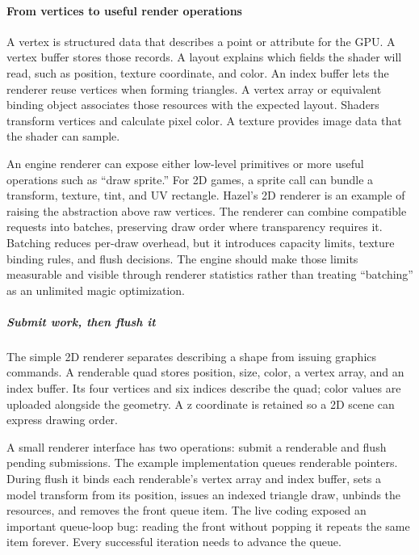 \paragraph{From vertices to useful render operations}\label{from-vertices-to-useful-render-operations}

A vertex is structured data that describes a point or attribute for the GPU. A vertex buffer stores those records. A layout explains which fields the shader will read, such as position, texture coordinate, and color. An index buffer lets the renderer reuse vertices when forming triangles. A vertex array or equivalent binding object associates those resources with the expected layout. Shaders transform vertices and calculate pixel color. A texture provides image data that the shader can sample.

An engine renderer can expose either low-level primitives or more useful operations such as ``draw sprite.'' For 2D games, a sprite call can bundle a transform, texture, tint, and UV rectangle. Hazel's 2D renderer is an example of raising the abstraction above raw vertices. The renderer can combine compatible requests into batches, preserving draw order where transparency requires it. Batching reduces per-draw overhead, but it introduces capacity limits, texture binding rules, and flush decisions. The engine should make those limits measurable and visible through renderer statistics rather than treating ``batching'' as an unlimited magic optimization.

\subparagraph{Submit work, then flush it}\label{submit-work-then-flush-it}

The simple 2D renderer separates describing a shape from issuing graphics commands. A renderable quad stores position, size, color, a vertex array, and an index buffer. Its four vertices and six indices describe the quad; color values are uploaded alongside the geometry. A z coordinate is retained so a 2D scene can express drawing order.

A small renderer interface has two operations: submit a renderable and flush pending submissions. The example implementation queues renderable pointers. During flush it binds each renderable's vertex array and index buffer, sets a model transform from its position, issues an indexed triangle draw, unbinds the resources, and removes the front queue item. The live coding exposed an important queue-loop bug: reading the front without popping it repeats the same item forever. Every successful iteration needs to advance the queue.

